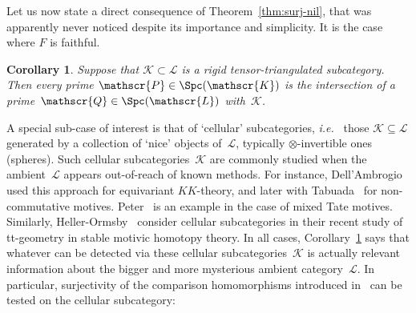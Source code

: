\documentclass{amsart}
\numberwithin{equation}{section}
\newtheorem{Cor}[equation]{Corollary}
\theoremstyle{remark}
\begin{document}
\medbreak

Let us now state a direct consequence of Theorem~\ref{thm:surj-nil}, that was apparently never noticed despite its importance and simplicity. It is the case where $F$ is faithful.
\begin{Cor}
\label{cor:surj-ff}Suppose that ${\mathscr{{K}}}\subset{\mathscr{{L}}}$ is a rigid tensor-triangulated subcategory. Then every prime ${{\mathscr{{P}}}}\in{\Spc({\mathscr{K}})}$ is the intersection of a prime~${{\mathscr{{Q}}}}\in{\Spc({\mathscr{L}})}$ with~${\mathscr{{K}}}$.
\end{Cor}

A special sub-case of interest is that of `cellular' subcategories, {{\sl i.e.}\ } those ${\mathscr{{K}}}\subseteq{\mathscr{{L}}}$ generated by a collection of `nice' objects of~${\mathscr{{L}}}$, typically $\otimes$-invertible ones (spheres). Such cellular subcategories~${\mathscr{{K}}}$ are commonly studied when the ambient~${\mathscr{{L}}}$ appears out-of-reach of known methods. For instance, Dell'Ambrogio~\cite{DellAmbrogio10} used this approach for equivariant $KK$-theory, and later with Tabuada~\cite{DellAmbrogioTabuada12} for non-commutative motives. Peter~\cite{Peter13} is an example in the case of mixed Tate motives. Similarly, Heller-Ormsby~\cite{HellerOrmsby16pp} consider cellular subcategories in their recent study of tt-geometry in stable motivic homotopy theory. In all cases, Corollary~\ref{cor:surj-ff} says that whatever can be detected via these cellular subcategories~${\mathscr{{K}}}$ is actually relevant information about the bigger and more mysterious ambient category~${\mathscr{{L}}}$. In particular, surjectivity of the comparison homomorphisms introduced in~\cite{Balmer10b} can be tested on the cellular subcategory:
\end{document}

